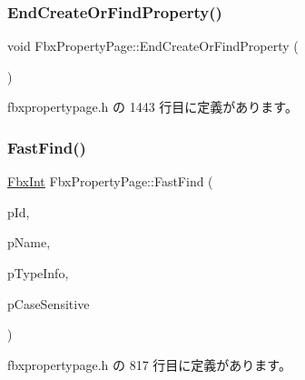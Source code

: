 \subsubsection{\texorpdfstring{End\+Create\+Or\+Find\+Property()}{EndCreateOrFindProperty()}}
{\footnotesize\ttfamily void Fbx\+Property\+Page\+::\+End\+Create\+Or\+Find\+Property (\begin{DoxyParamCaption}{ }\end{DoxyParamCaption})\hspace{0.3cm}{\ttfamily [inline]}}



 fbxpropertypage.\+h の 1443 行目に定義があります。

\mbox{\label{class_fbx_property_page_a613c04018ba60d91fa1a987070035491}} 
\subsubsection{\texorpdfstring{Fast\+Find()}{FastFind()}}
{\footnotesize\ttfamily \hyperlink{fbxtypes_8h_a088fa96de3b0b3ea69f0f6afef525dfb}{Fbx\+Int} Fbx\+Property\+Page\+::\+Fast\+Find (\begin{DoxyParamCaption}\item[{\hyperlink{fbxtypes_8h_a088fa96de3b0b3ea69f0f6afef525dfb}{Fbx\+Int}}]{p\+Id,  }\item[{const char $\ast$}]{p\+Name,  }\item[{\hyperlink{class_fbx_property_page}{Fbx\+Property\+Page} $\ast$}]{p\+Type\+Info,  }\item[{bool}]{p\+Case\+Sensitive }\end{DoxyParamCaption})\hspace{0.3cm}{\ttfamily [inline]}}



 fbxpropertypage.\+h の 817 行目に定義があります。

\mbox{\label{class_fbx_property_page_abb78155142e1cc255d2b2e74c8a262ff}} 
